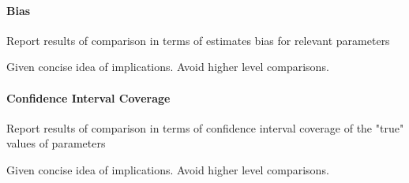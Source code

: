 \paragraph{Bias}
	Report results of comparison in terms of estimates bias for relevant parameters

	Given concise idea of implications. Avoid higher level comparisons.
	
\paragraph{Confidence Interval Coverage}
	Report results of comparison in terms of confidence interval coverage of the "true" values of parameters 

	Given concise idea of implications. Avoid higher level comparisons.
	

